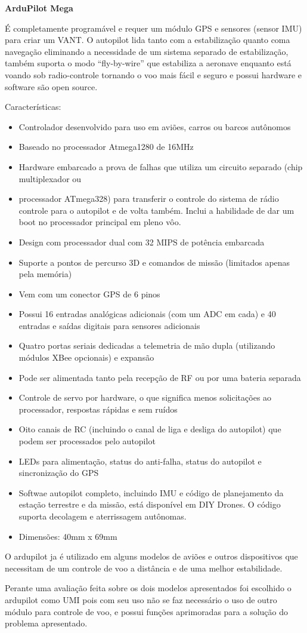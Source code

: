 \textbf{ArduPilot Mega}

É completamente programável e requer um módulo GPS e sensores (sensor IMU) para criar um VANT. O autopilot lida tanto com a estabilização quanto coma navegação eliminando a necessidade de um sistema separado de estabilização, também suporta o modo “fly-by-wire” que estabiliza a aeronave enquanto está voando sob radio-controle tornando o voo mais fácil e seguro e possui hardware e software são open source.

Características:
\begin{itemize}
	\item Controlador desenvolvido para uso em aviões, carros ou barcos autônomos
	\item Baseado no processador Atmega1280 de 16MHz
	\item Hardware embarcado a prova de falhas que utiliza um circuito separado (chip multiplexador ou \item processador ATmega328) para transferir o controle do sistema de rádio controle para o autopilot e de volta também. Inclui a habilidade de dar um boot no processador principal em pleno vôo.
	\item Design com processador dual com 32 MIPS de potência embarcada
	\item Suporte a pontos de percurso 3D e comandos de missão (limitados apenas pela memória)
	\item Vem com um conector GPS de 6 pinos
	\item Possui 16 entradas analógicas adicionais (com um ADC em cada) e 40 entradas e saídas digitais para sensores adicionais
	\item Quatro portas seriais dedicadas a telemetria de mão dupla (utilizando módulos XBee opcionais) e expansão
	\item Pode ser alimentada tanto pela recepção de RF ou por uma bateria separada
	\item Controle de servo por hardware, o que significa menos solicitações ao processador, respostas rápidas e sem ruídos
	\item Oito canais de RC (incluindo o canal de liga e desliga do autopilot) que podem ser processados pelo autopilot
	\item LEDs para alimentação, status do anti-falha, status do autopilot e sincronização do GPS
	\item Softwae autopilot completo, incluindo IMU e código de planejamento da estação terrestre e da missão, está disponível em  DIY Drones. O código suporta decolagem e aterrissagem autônomas.
	\item Dimensões: 40mm x 69mm
\end{itemize}

O ardupilot ja é utilizado em alguns modelos de aviões e outros dispositivos que necessitam de um controle de voo a distância e de uma melhor estabilidade.

Perante uma avaliação feita sobre os dois modelos apresentados foi escolhido o ardupilot como UMI pois com seu uso não se faz necessário o uso de outro módulo para controle de voo, e possui funções aprimoradas para a solução do problema apresentado.

